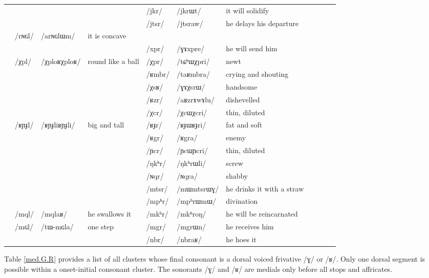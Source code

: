 \documentclass[oldfontcommands,oneside,a4paper,11pt]{article}
\newcommand{\ipa}[1]{/#1/} %
\newcommand{\trois}[1]{/#1/}
\newcommand{\tib}[1]{\cellcolor{lightgray}\textbf{#1}}
\newcommand{\idph}[1]{\cellcolor{gray}\textbf{#1}}
\begin{document}
\begin{table}
{\begin{tabular}{l|lll|lll|lll|l}
\midrule							
	&	&	&	&\trois{jkr}  	& \ipa{jkrɯt}  	& it will solidify \\	
	&	&	&	&\trois{jtsr}  	& \ipa{jtsraw}  	&he delays his departure \\	
\midrule							
	& \trois{rɴɢl}  	& \ipa{arɴɢlɯm}  	&it is concave 	&	&	&\\	
	&	&	&	& \trois{xpr}  	& \ipa{ɣɤxpre}  	&he will send him \\	
\midrule							
	&\trois{χpl} \idph{}	&\ipa{χploʁχploʁ}  	&round like a ball	&\trois{χpr}  	& \ipa{tɕʰɯχpri}  	& newt\\	
	&	&	&	&\trois{ʁmbr}  	& \ipa{taʁmbra}  	& crying and shouting\\	
	&	&	&	&\trois{χsʁ}  	& \ipa{ɣɤχsrɯ}  	& handsome \\	
	&	&	&	&\trois{ʁzr}  	& \ipa{aʁzrɤwɤlu}  	& dishevelled\\	
	&	&	&	&\trois{χcr} \idph{} 	& \ipa{χcɯχcri}  	& thin, diluted \\	
	&\trois{ʁɲɟl}  \idph{}	& \ipa{ʁɲɟliʁɲɟli}  	& big and tall	&\trois{ʁɟr}  \idph{}	& \ipa{ʁɟɯʁɟri}  	& fat and soft\\	
	&	&	&	&\trois{ʁgr} \tib{}  	& \ipa{ʁgra}  	& enemy\\	
\midrule							
	&	&	&	&\trois{ɲcr} \idph{} 	& \ipa{ɲcɯɲcri}  	&thin, diluted \\	
	&	&	&	&\trois{ŋkʰr}  	& \ipa{ŋkʰrɯli}  	&screw \\	
	&	&	&	&\trois{ɴqr}  	& \ipa{ɴqra}  	& shabby\\	
\midrule							
	&	&	&	&\trois{mtsr}  	& \ipa{mɯmtsrɯɣ}  	&he drinks it with a straw \\	
	&	&	&	&\trois{mpʰr}  	& \ipa{mpʰrɯmɯ}  	& divination\\	
	&\trois{mql}  	& \ipa{mqlaʁ}  	& he swallows it	&\trois{mkʰr}  	& \ipa{mkʰroŋ}  	&he will be reincarnated \\	
	&\trois{mɢl}  	& \ipa{tɯ-mɢla}  	& one step	&\trois{mgr}  	& \ipa{mgrɯn}  	& he receives him\\	
\midrule							
	&	&	&	&\trois{nbr}  	& \ipa{nbraʁ}  	&he hoes it \\	
\end{tabular}}
\end{table}	
						
		Table  \ref{med.G.R} provides a  list of all clusters whose final consonant is a dorsal voiced frivative  \ipa{ɣ} or \ipa{ʁ}.  Only one dorsal segment is possible within a onset-initial consonant cluster. The sonorants \ipa{ɣ} and \ipa{ʁ} are medials only before all stops and affricates.
						
\end{document}
